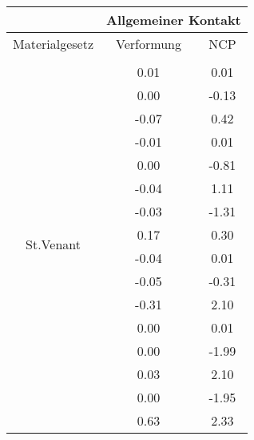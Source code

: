 \begin{table} 
\centering 
\begin{tabular}{c|cc|} 
\cline{2-3} 
 & \multicolumn{2}{|c|}{Allgemeiner Kontakt} \\ 
\hline 
\multicolumn{1}{|c|}{Materialgesetz} & \multicolumn{1}{c|}{Verformung} & \multicolumn{1}{c|}{NCP} \\ 
\hline 
\multicolumn{1}{|c|}{\multirow{101}{*}{St.Venant}} &\multicolumn{1}{|c|}{} & \multicolumn{1}{|c|}{} \\ 
\multicolumn{1}{|c|}{} & \multicolumn{1}{|c|}{      0.01} & \multicolumn{1}{|c|}{      0.01} \\ 
\multicolumn{1}{|c|}{} & \multicolumn{1}{|c|}{      0.00} & \multicolumn{1}{|c|}{     -0.13} \\ 
\multicolumn{1}{|c|}{} & \multicolumn{1}{|c|}{     -0.07} & \multicolumn{1}{|c|}{      0.42} \\ 
\multicolumn{1}{|c|}{} & \multicolumn{1}{|c|}{     -0.01} & \multicolumn{1}{|c|}{      0.01} \\ 
\multicolumn{1}{|c|}{} & \multicolumn{1}{|c|}{      0.00} & \multicolumn{1}{|c|}{     -0.81} \\ 
\multicolumn{1}{|c|}{} & \multicolumn{1}{|c|}{     -0.04} & \multicolumn{1}{|c|}{      1.11} \\ 
\multicolumn{1}{|c|}{} & \multicolumn{1}{|c|}{     -0.03} & \multicolumn{1}{|c|}{     -1.31} \\ 
\multicolumn{1}{|c|}{} & \multicolumn{1}{|c|}{      0.17} & \multicolumn{1}{|c|}{      0.30} \\ 
\multicolumn{1}{|c|}{} & \multicolumn{1}{|c|}{     -0.04} & \multicolumn{1}{|c|}{      0.01} \\ 
\multicolumn{1}{|c|}{} & \multicolumn{1}{|c|}{     -0.05} & \multicolumn{1}{|c|}{     -0.31} \\ 
\multicolumn{1}{|c|}{} & \multicolumn{1}{|c|}{     -0.31} & \multicolumn{1}{|c|}{      2.10} \\ 
\multicolumn{1}{|c|}{} & \multicolumn{1}{|c|}{      0.00} & \multicolumn{1}{|c|}{      0.01} \\ 
\multicolumn{1}{|c|}{} & \multicolumn{1}{|c|}{      0.00} & \multicolumn{1}{|c|}{     -1.99} \\ 
\multicolumn{1}{|c|}{} & \multicolumn{1}{|c|}{      0.03} & \multicolumn{1}{|c|}{      2.10} \\ 
\multicolumn{1}{|c|}{} & \multicolumn{1}{|c|}{      0.00} & \multicolumn{1}{|c|}{     -1.95} \\ 
\multicolumn{1}{|c|}{} & \multicolumn{1}{|c|}{      0.63} & \multicolumn{1}{|c|}{      2.33} \\ 

\end{tabular}
\end{table}
